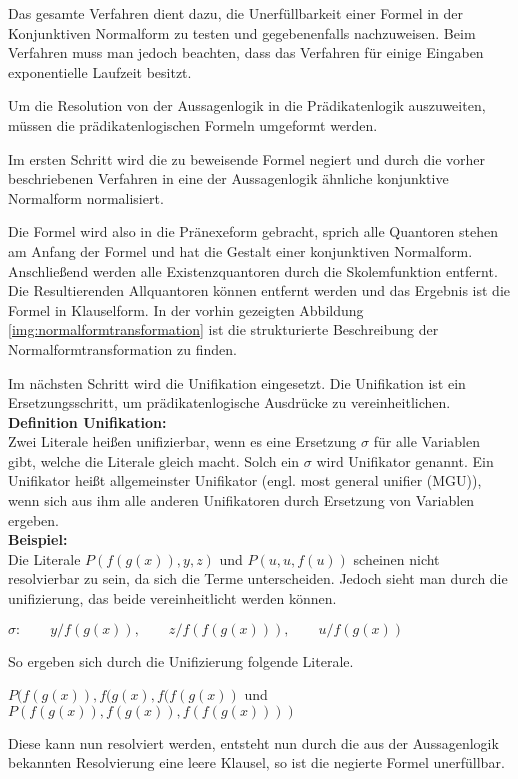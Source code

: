 Das gesamte Verfahren dient dazu, die Unerfüllbarkeit einer Formel in der Konjunktiven Normalform zu testen und gegebenenfalls nachzuweisen. Beim Verfahren muss man jedoch beachten, dass das Verfahren für einige Eingaben exponentielle Laufzeit besitzt.

Um die Resolution von der Aussagenlogik in die Prädikatenlogik auszuweiten, müssen die prädikatenlogischen Formeln umgeformt werden.

Im ersten Schritt wird die zu beweisende Formel negiert und durch die vorher beschriebenen Verfahren in eine der Aussagenlogik ähnliche konjunktive Normalform normalisiert. 

Die Formel wird also in die Pränexeform gebracht, sprich alle Quantoren stehen am Anfang der Formel und hat die Gestalt einer konjunktiven Normalform. Anschließend werden alle Existenzquantoren durch die Skolemfunktion entfernt. Die Resultierenden Allquantoren können entfernt werden und das Ergebnis ist die Formel in Klauselform. In der vorhin gezeigten Abbildung \ref{img:normalformtransformation} ist die strukturierte Beschreibung der Normalformtransformation zu finden.

Im nächsten Schritt wird die Unifikation eingesetzt. Die Unifikation ist ein Ersetzungsschritt, um prädikatenlogische Ausdrücke zu vereinheitlichen.\\

\textbf{Definition Unifikation:}\\
Zwei Literale heißen unifizierbar, wenn es eine Ersetzung $\sigma$ für alle Variablen gibt, welche die Literale gleich macht. Solch ein $\sigma$ wird Unifikator genannt. Ein Unifikator heißt allgemeinster Unifikator (engl. most general unifier (MGU)), wenn sich aus ihm alle anderen Unifikatoren durch Ersetzung von Variablen ergeben. \cite[vgl. S.51]{GrundkursKI}\\


\textbf{Beispiel:}\\
Die Literale $P(f(g(x)), y, z)$ und  $P(u, u, f(u))$ scheinen nicht resolvierbar zu sein, da sich die Terme unterscheiden. Jedoch sieht man durch die unifizierung, das beide vereinheitlicht werden können.\\

\begin{center}
$\sigma: \qquad y/f(g(x)),\qquad z/f(f(g(x))),\qquad u/f(g(x))$
\end{center}
So ergeben sich durch die Unifizierung folgende Literale.

\begin{center}
$P(f(g(x)), f(g(x), f(f(g(x))$ und  $P(f(g(x)), f(g(x)) , f(f(g(x))))$
\end{center}
Diese kann nun resolviert werden, entsteht nun durch die aus der Aussagenlogik bekannten  Resolvierung eine leere Klausel, so ist die negierte Formel unerfüllbar.\cite[vgl. S.52]{GrundkursKI}\\


